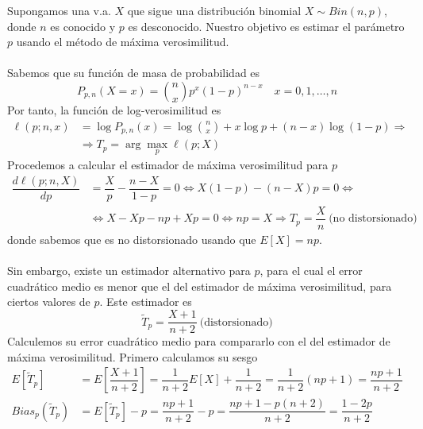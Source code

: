 \begin{ejemplo}
    Supongamos una v.a. $X$ que sigue una distribución binomial $X \sim Bin(n, p)$, donde $n$ es conocido y $p$ es desconocido. Nuestro objetivo es estimar el parámetro $p$ usando el método de máxima verosimilitud. \\ \\
    \noindent
    Sabemos que su función de masa de probabilidad es
    \begin{equation*}
        P_{p,n}(X=x) = \binom{n}{x} p^x (1-p)^{n-x} \quad x=0,1,\ldots,n
    \end{equation*}
    Por tanto, la función de log-verosimilitud es
    \begin{align*}
        \ell(p; n,x) &= \log P_{p,n}(x) = \log \binom{n}{x} + x \log p + (n-x) \log(1-p) \Longrightarrow \\
        &\Longrightarrow T_p = \arg \max_{p} \ell(p; X)
    \end{align*}
    Procedemos a calcular el estimador de máxima verosimilitud para $p$
    \begin{align*}
        \dfrac{d \ell(p; n,X)}{d p} &= \dfrac{X}{p} - \dfrac{n-X}{1-p} = 0 \Longleftrightarrow X(1-p) - (n-X)p = 0 \Longleftrightarrow \\
        &\Longleftrightarrow X - Xp - np + Xp = 0 \Longleftrightarrow np = X \Longrightarrow T_p = \dfrac{X}{n} \ \text{(no distorsionado)}
    \end{align*}
    donde sabemos que es no distorsionado usando que $E[X] = np$. \\ \\
    \noindent
    Sin embargo, existe un estimador alternativo para $p$, para el cual el error cuadrático medio es menor que el del estimador de máxima verosimilitud, para ciertos valores de $p$. Este estimador es
    \begin{equation*}
        \tilde{T}_p = \dfrac{X+1}{n+2} \ \text{(distorsionado)}
    \end{equation*}
    Calculemos su error cuadrático medio para compararlo con el del estimador de máxima verosimilitud. Primero calculamos su sesgo
    \begin{align*}
        E[\tilde{T}_p] &= E\left[ \dfrac{X+1}{n+2} \right] = \dfrac{1}{n+2} E[X] + \dfrac{1}{n+2} = \dfrac{1}{n+2} (np + 1) = \dfrac{np + 1}{n+2} \\
        Bias_p(\tilde{T}_p) &= E[\tilde{T}_p] - p = \dfrac{np + 1}{n+2} - p = \dfrac{np + 1 - p(n+2)}{n+2} = \dfrac{1 - 2p}{n+2}
    \end{align*}

\end{ejemplo}
